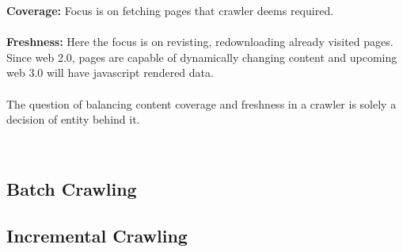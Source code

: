 \begin{description}
\textbf{Coverage:} Focus is on fetching pages that crawler deems required. \leavemode \\
\\
\textbf{Freshness:} Here the focus is on revisting, redownloading already visited pages. Since web 2.0,
pages are capable of dynamically changing content and upcoming web 3.0 will have javascript rendered data.
\\
\\
The question of balancing content coverage and freshness in a crawler is solely a decision of entity behind
it.
\end{description}
\\
 

\subsection{Batch Crawling}

\subsection{Incremental Crawling}



